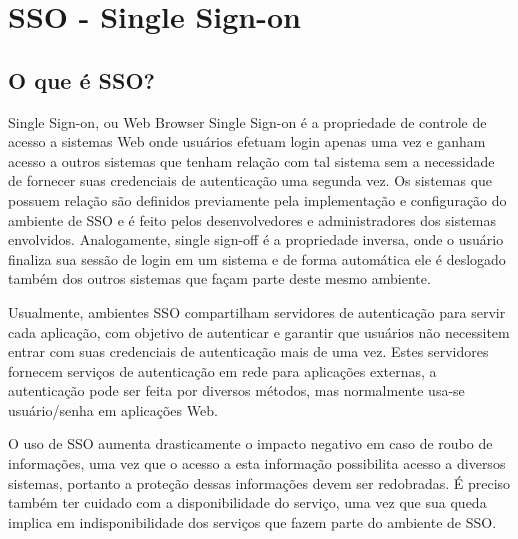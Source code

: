 \documentclass[11pt]{article}
\begin{document}
\lstset{language=Ruby}


\clearpage

\clearpage

\tableofcontents
\clearpage
\listoffigures

\clearpage



\section{SSO - Single Sign-on}

\subsection{O que é SSO?}

Single Sign-on, ou Web Browser Single Sign-on é a propriedade de controle de
acesso a sistemas Web onde usuários efetuam login apenas uma vez e ganham acesso a
outros sistemas que tenham relação com tal sistema sem a necessidade de fornecer
suas credenciais de autenticação uma segunda vez. Os sistemas que possuem
relação são definidos previamente pela implementação e configuração do
ambiente de SSO e é feito pelos desenvolvedores e administradores dos sistemas envolvidos.
Analogamente, single sign-off é a propriedade inversa, onde o usuário finaliza
sua sessão de login em um sistema e de forma automática ele é deslogado também
dos outros sistemas que façam parte deste mesmo ambiente.

Usualmente, ambientes SSO compartilham servidores de autenticação para servir
cada aplicação, com objetivo de autenticar e garantir que usuários não
necessitem entrar com suas credenciais de autenticação mais de uma
vez\cite{wikipediaSingleSignOn}. Estes servidores
fornecem serviços de autenticação em rede para aplicações externas, a
autenticação pode ser feita por diversos métodos, mas normalmente usa-se
usuário/senha\cite{wikipediaAuthenticationServer} em
aplicações Web.

O uso de SSO aumenta drasticamente o impacto negativo em caso de roubo de
informações, uma vez que o acesso a esta informação possibilita acesso a
diversos sistemas, portanto a proteção dessas informações devem ser redobradas.
É preciso também ter cuidado com a disponibilidade do serviço, uma vez
que sua queda implica em indisponibilidade dos serviços que fazem parte do
ambiente de SSO.
\end{document}
